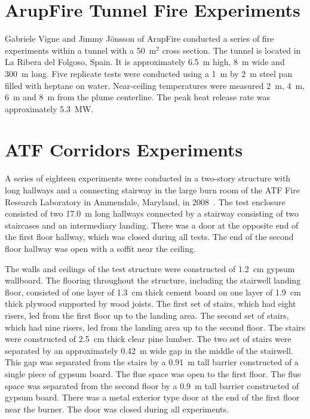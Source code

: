 \section{ArupFire Tunnel Fire Experiments}
\label{ArupFire_Tunnel_Fire_Description}

Gabriele Vigne and Jimmy J\"{o}nsson of ArupFire conducted a series of fire experiments within a tunnel with a 50~m$^2$ cross section. The tunnel is located in La Ribera del Folgoso, Spain. It is approximately 6.5~m high, 8~m wide and 300~m long. Five replicate tests were conducted using a 1~m by 2~m steel pan filled with heptane on water. Near-ceiling temperatures were measured 2~m, 4~m, 6~m and 8~m from the plume centerline. The peak heat release rate was approximately 5.3~MW.


\section{ATF Corridors Experiments}
\label{ATF_Corridors_Description}

A series of eighteen experiments were conducted in a two-story structure with long hallways and a connecting stairway in the large burn room of the ATF Fire Research Laboratory in Ammendale, Maryland, in 2008~\cite{Sheppard:Corridors}. The test enclosure consisted of two 17.0~m long hallways connected by a stairway consisting of two staircases and an intermediary landing. There was a door at the opposite end of the first floor hallway, which was closed during all tests. The end of the second floor hallway was open with a soffit near the ceiling.

The walls and ceilings of the test structure were constructed of 1.2~cm gypsum wallboard. The flooring throughout the structure, including the stairwell landing floor, consisted of one layer of 1.3~cm thick cement board on one layer of 1.9~cm thick plywood supported by wood joists. The first set of stairs, which had eight risers, led from the first floor up to the landing area. The second set of stairs, which had nine risers, led from the landing area up to the second floor. The stairs were constructed of 2.5~cm thick clear pine lumber. The two set of stairs were separated by an approximately 0.42~m wide gap in the middle of the stairwell. This gap was separated from the stairs by a 0.91~m tall barrier constructed of a single piece of gypsum board. The flue space was open to the first floor.  The flue space was separated from the second floor by a 0.9~m tall barrier constructed of gypsum board. There was a metal exterior type door at the end of the first floor near the burner.  The door was closed during all experiments.

